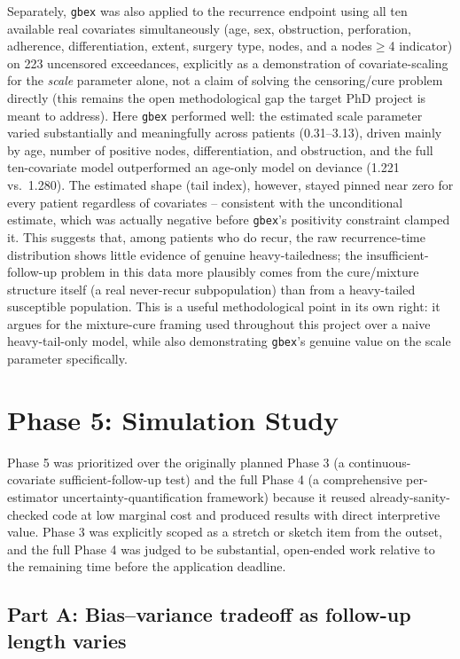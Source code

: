 \documentclass[11pt]{article}
\begin{document}
Separately, \texttt{gbex} was also applied to the recurrence endpoint using all ten
available real covariates simultaneously (age, sex, obstruction, perforation,
adherence, differentiation, extent, surgery type, nodes, and a nodes$\geq$4
indicator) on 223 uncensored exceedances, explicitly as a demonstration of
covariate-scaling for the \emph{scale} parameter alone, not a claim of solving the
censoring/cure problem directly (this remains the open methodological gap the
target PhD project is meant to address). Here \texttt{gbex} performed
well: the estimated scale parameter varied substantially and meaningfully across
patients (0.31--3.13), driven mainly by age, number of positive nodes,
differentiation, and obstruction, and the full ten-covariate model outperformed an
age-only model on deviance (1.221 vs.\ 1.280). The estimated shape (tail index),
however, stayed pinned near zero for every patient regardless of covariates --
consistent with the unconditional estimate, which was actually negative before
\texttt{gbex}'s positivity constraint clamped it. This suggests that, among
patients who do recur, the raw recurrence-time distribution shows little evidence
of genuine heavy-tailedness; the insufficient-follow-up problem in this data more
plausibly comes from the cure/mixture structure itself (a real never-recur
subpopulation) than from a heavy-tailed susceptible population. This is a useful
methodological point in its own right: it argues for the mixture-cure framing used
throughout this project over a naive heavy-tail-only model, while also
demonstrating \texttt{gbex}'s genuine value on the scale parameter specifically.

\section{Phase 5: Simulation Study}

Phase 5 was prioritized over the originally planned Phase 3 (a continuous-covariate
sufficient-follow-up test) and the full Phase 4 (a comprehensive per-estimator
uncertainty-quantification framework) because it reused already-sanity-checked code at
low marginal cost and produced results with direct interpretive value. Phase 3 was
explicitly scoped as a stretch or sketch item from the outset, and the full Phase 4
was judged to be substantial, open-ended work relative to the remaining time before
the application deadline.

\subsection{Part A: Bias--variance tradeoff as follow-up length varies}
\end{document}

